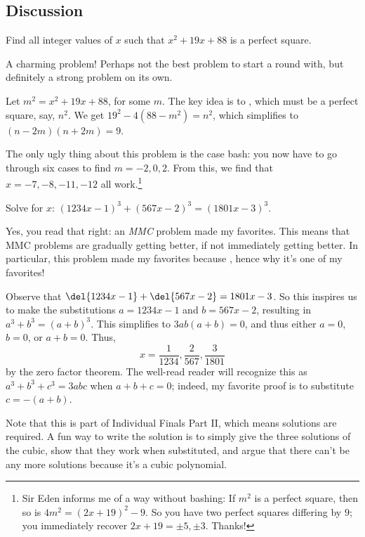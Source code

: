 \documentclass[11pt,paper=letter]{scrartcl}
\begin{document}
\subsection{Discussion}

\begin{probboxed}
   Find all integer values of $x$ such that $x^2 + 19x + 88$ is a perfect square.
\end{probboxed}

A charming problem! Perhaps not the best problem to start a round with, but definitely a strong problem on its own. 

Let $m^2 = x^2 + 19x + 88$, for some $m$. The key idea is to , which must be a perfect square, say, $n^2$. We get $19^2 - 4(88 - m^2) = n^2$, which simplifies to $(n - 2m)(n + 2m) = 9$. 

The only ugly thing about this problem is the case bash: you now have to go through six cases to find $m = -2, 0, 2$. From this, we find that $x = -7, -8, -11, -12$ all work.\footnote{Sir Eden informs me of a way without bashing: If $m^2$ is a perfect square, then so is $4m^2 = (2x+19)^2 - 9$. So you have two perfect squares differing by $9$; you immediately recover $2x + 19 = \pm5, \pm3$. Thanks!}

\begin{probboxed}
   Solve for $x$: $(1234x-1)^3+(567x-2)^3=(1801x-3)^3$.
\end{probboxed}

Yes, you read that right: an \emph{MMC} problem made my favorites. This means that MMC problems are gradually getting better, if not immediately getting better. In particular, this problem made my favorites because , hence why it's one of my favorites!

Observe that $\del{1234x - 1} + \del{567x- 2} = 1801x-3$. So this inspires us to make the substitutions $a = 1234x - 1$ and $b = 567x - 2$, resulting in $a^3 + b^3 = (a + b)^3$. This simplifies to $3ab(a + b) = 0$, and thus either $a = 0$, $b = 0$, or $a + b = 0$. Thus, $$x = \dfrac1{1234}, \dfrac2{567}, \dfrac3{1801}$$ by the zero factor theorem. The well-read reader will recognize this as $a^3 + b^3 + c^3 = 3abc$ when $a + b + c = 0$; indeed, my favorite proof is to substitute $c = -(a + b)$.

Note that this is part of Individual Finals Part II, which means solutions are required. A fun way to write the solution is to simply give the three solutions of the cubic, show that they work when substituted, and argue that there can't be any more solutions because it's a cubic polynomial.
\end{document}
